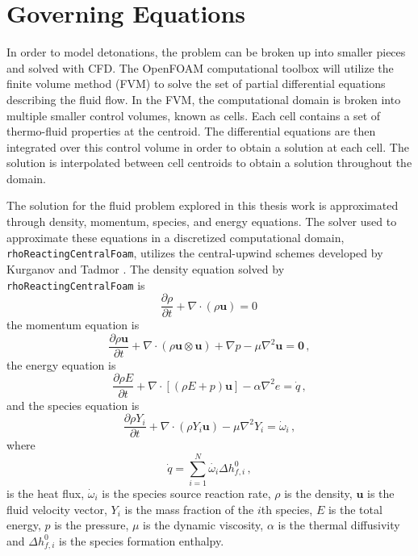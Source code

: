 \section{Governing Equations}
In order to model detonations, the problem can be broken up into smaller pieces and solved with CFD. The OpenFOAM computational toolbox will utilize the finite volume method (FVM) to solve the set of partial differential equations describing the fluid flow. In the FVM, the computational domain is broken into multiple smaller control volumes, known as cells. Each cell contains a set of thermo-fluid properties at the centroid. The differential equations are then integrated over this control volume in order to obtain a solution at each cell. The solution is interpolated between cell centroids to obtain a solution throughout the domain. 

The solution for the fluid problem explored in this thesis work is approximated through density, momentum, species, and energy equations. The solver used to approximate these equations in a discretized computational domain, \verb|rhoReactingCentralFoam|, utilizes the central-upwind schemes developed by Kurganov and Tadmor \cite{kurganov1}. The density equation solved by \verb|rhoReactingCentralFoam| is
\begin{equation}
\frac{\partial \rho}{\partial t} + \nabla \cdot \left(\rho \bm{u}\right) = 0\,
\end{equation}
the momentum equation is
\begin{equation}
\frac{\partial \rho\bm{u}}{\partial t} + \nabla \cdot \left(\rho \bm{u}\otimes \bm{u}\right) + \nabla p -\mu\nabla^2\bm{u}= \bm{0}\,,
\end{equation}
the energy equation is
\begin{equation}
\frac{\partial \rho E}{\partial t} + \nabla \cdot \left[\left(\rho E + p\right)\bm{u}\right] -\alpha\nabla^2 e = \dot{q}\,,
\end{equation}
and the species equation is
\begin{equation}
\frac{\partial \rho Y_i}{\partial t} + \nabla \cdot \left(\rho Y_i \bm{u}\right) -\mu\nabla^2 Y_i= \dot{\omega}_i\,,
\end{equation}
where 
\begin{equation}
\dot{q} = \sum_{i = 1}^N \dot{\omega_i} \Delta h_{f,i}^0\,,
\end{equation}
is the heat flux, $\dot{\omega}_i$ is the species source reaction rate, $\rho$ is the density, $\bm{u}$ is the fluid velocity vector, $Y_i$ is the mass fraction of the $i$th species, $E$ is the total energy, $p$ is the pressure, $\mu$ is the dynamic viscosity, $\alpha$ is the thermal diffusivity and $\Delta h_{f,i}^0$ is the species formation enthalpy.

